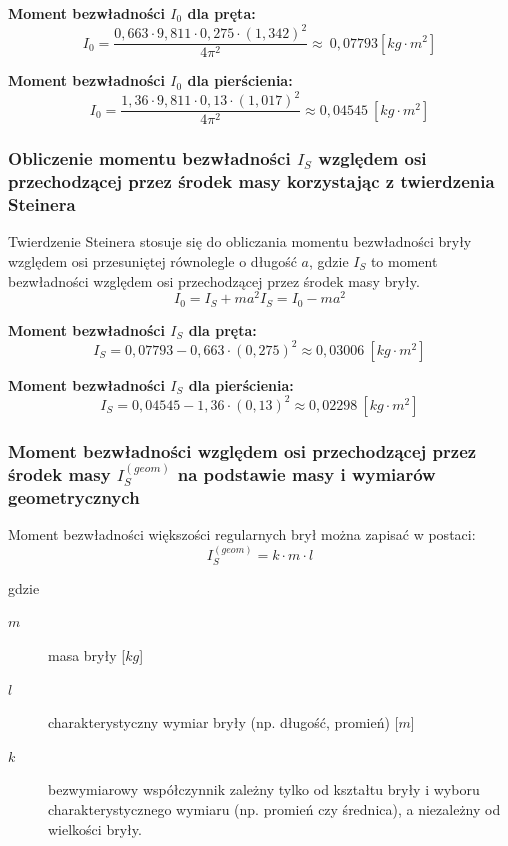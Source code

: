 \documentclass[a4paper,11pt]{article}
\begin{document}
\textbf{Moment bezwładności $I_{0}$ dla pręta:}
\begin{equation}
I_{0} = \dfrac{0,663\cdot 9,811 \cdot 0,275 \cdot (1,342)^{2}}{4\pi^{2}}\approx ~0,07793 \left[kg \cdot m^{2}\right]
\end{equation}

\textbf{Moment bezwładności $I_{0}$ dla pierścienia:}
\begin{equation}
I_{0} = \dfrac{1,36\cdot 9,811\cdot 0,13 \cdot (1,017)^{2}}{4\pi^{2}}\approx 0,04545~ \left[kg \cdot m^{2}\right]
\end{equation}

\subsubsection{Obliczenie momentu bezwładności $I_{S}$ względem osi przechodzącej przez środek masy korzystając z twierdzenia Steinera}
\indent Twierdzenie Steinera stosuje się do obliczania momentu bezwładności bryły względem osi przesuniętej równolegle o długość $a$, gdzie $I_{S}$ to moment bezwładności względem osi przechodzącej przez środek masy bryły.
\begin{equation}
I_{0}=I_{S}+ma^{2}
I_{S}=I_{0}-ma^{2}
\end{equation}

\textbf{Moment bezwładności $I_{S}$ dla pręta:}
\begin{equation}
I_{S} =0,07793 - 0,663 \cdot (0,275)^{2}\approx 0,03006 ~ \left[kg \cdot m^{2}\right]
\end{equation}

\textbf{Moment bezwładności $I_{S}$ dla pierścienia:}
\begin{equation}
I_{S} = 0,04545 - 1,36 \cdot (0,13)^{2}\approx 0,02298 ~ \left[kg \cdot m^{2}\right]
\end{equation}


\subsubsection{Moment bezwładności względem osi przechodzącej przez środek masy $I_{S}^{(geom)}$ na podstawie masy i wymiarów geometrycznych}
\indent Moment bezwładności większości regularnych brył można zapisać w postaci:
\begin{equation}
I_{S}^{(geom)} = k \cdot m \cdot l
\end{equation} 

gdzie 
\begin{description}
\item [$m$] masa bryły [$kg$]
\item [$l$] charakterystyczny wymiar bryły (np. długość, promień) [$m$]
\item [$k$] bezwymiarowy współczynnik zależny tylko od kształtu bryły i wyboru charakterystycznego wymiaru (np. promień czy średnica), a niezależny od wielkości bryły.
\end{description}
\end{document}
